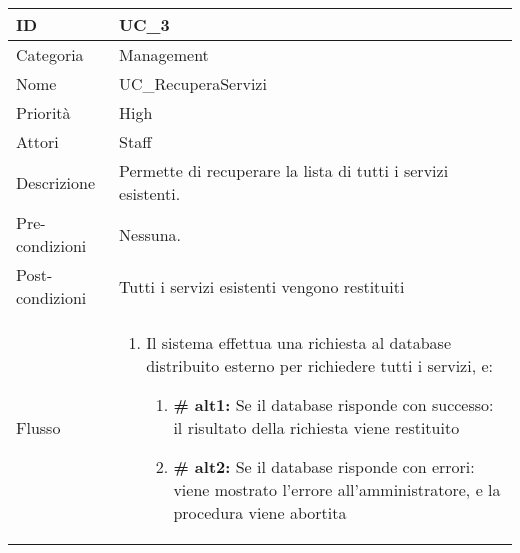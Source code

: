 \begin{center}
\begin{tabular}{ |p{2cm}|p{13cm}|  }
\hline
ID & UC\_3 \\\hline
Categoria & Management\\\hline
Nome & UC\_RecuperaServizi\\\hline
Priorità & High \\\hline
Attori &  Staff \\\hline
Descrizione & Permette di recuperare la lista di tutti i servizi esistenti.\\\hline
Pre-condizioni &  Nessuna.\\\hline
Post-condizioni &  Tutti i servizi esistenti vengono restituiti\\\hline
Flusso &  	\begin{enumerate}
			\item Il sistema effettua una richiesta al database distribuito esterno per richiedere tutti i servizi, e:
				\begin{enumerate}[label*=\arabic*.]
				\item \textbf{\# alt1:} Se il database risponde con successo: il risultato della richiesta viene restituito
				\item \textbf{\# alt2:} Se il database risponde con errori: viene mostrato l'errore all'amministratore, e la procedura viene abortita
				\end{enumerate}
		\end{enumerate}\\\hline
\end{tabular}
\label{table_use_case:3}\newline


\end{center}
